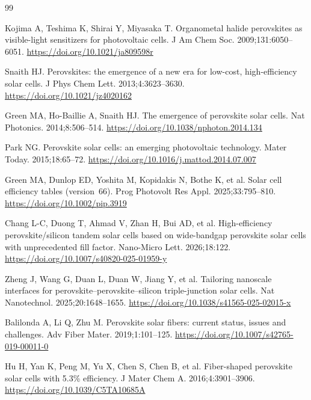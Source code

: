\documentclass[pdflatex,sn-mathphys-num,iicol]{sn-jnl}
\theoremstyle{thmstyleone}
\theoremstyle{thmstyletwo}
\theoremstyle{thmstylethree}
\begin{document}
\begin{appendices}
\end{appendices}


\begin{thebibliography}{99}

Kojima A, Teshima K, Shirai Y, Miyasaka T.
Organometal halide perovskites as visible-light sensitizers for
photovoltaic cells.
J Am Chem Soc. 2009;131:6050--6051.
\url{https://doi.org/10.1021/ja809598r}

Snaith HJ.
Perovskites: the emergence of a new era for low-cost, high-efficiency
solar cells.
J Phys Chem Lett. 2013;4:3623--3630.
\url{https://doi.org/10.1021/jz4020162}

Green MA, Ho-Baillie A, Snaith HJ.
The emergence of perovskite solar cells.
Nat Photonics. 2014;8:506--514.
\url{https://doi.org/10.1038/nphoton.2014.134}

Park NG.
Perovskite solar cells: an emerging photovoltaic technology.
Mater Today. 2015;18:65--72.
\url{https://doi.org/10.1016/j.mattod.2014.07.007}

Green MA, Dunlop ED, Yoshita M, Kopidakis N, Bothe K, et al.
Solar cell efficiency tables (version~66).
Prog Photovolt Res Appl. 2025;33:795--810.
\url{https://doi.org/10.1002/pip.3919}

Chang L-C, Duong T, Ahmad V, Zhan H, Bui AD, et al.
High-efficiency perovskite/silicon tandem solar cells based on
wide-bandgap perovskite solar cells with unprecedented fill factor.
Nano-Micro Lett. 2026;18:122.
\url{https://doi.org/10.1007/s40820-025-01959-y}

Zheng J, Wang G, Duan L, Duan W, Jiang Y, et al.
Tailoring nanoscale interfaces for perovskite--perovskite--silicon
triple-junction solar cells.
Nat Nanotechnol. 2025;20:1648--1655.
\url{https://doi.org/10.1038/s41565-025-02015-x}

Balilonda A, Li Q, Zhu M.
Perovskite solar fibers: current status, issues and challenges.
Adv Fiber Mater. 2019;1:101--125.
\url{https://doi.org/10.1007/s42765-019-00011-0}

Hu H, Yan K, Peng M, Yu X, Chen S, Chen B, et al.
Fiber-shaped perovskite solar cells with 5.3\% efficiency.
J Mater Chem A. 2016;4:3901--3906.
\url{https://doi.org/10.1039/C5TA10685A}


\end{thebibliography}
\end{document}
